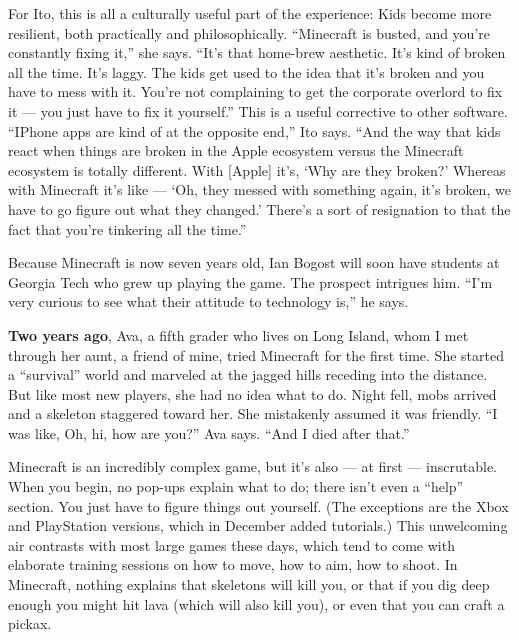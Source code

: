 For Ito, this is all a culturally useful part of the experience: Kids
become more resilient, both practically and philosophically. ``Minecraft
is busted, and you're constantly fixing it,'' she says. ``It's that
home-brew aesthetic. It's kind of broken all the time. It's laggy. The
kids get used to the idea that it's broken and you have to mess with it.
You're not complaining to get the corporate overlord to fix it --- you
just have to fix it yourself.'' This is a useful corrective to other
software. ``IPhone apps are kind of at the opposite end,'' Ito says.
``And the way that kids react when things are broken in the Apple
ecosystem versus the Minecraft ecosystem is totally different. With
{[}Apple{]} it's, `Why are they broken?' Whereas with Minecraft it's
like --- `Oh, they messed with something again, it's broken, we have to
go figure out what they changed.' There's a sort of resignation to that
the fact that you're tinkering all the time.''

Because Minecraft is now seven years old, Ian Bogost will soon have
students at Georgia Tech who grew up playing the game. The prospect
intrigues him. ``I'm very curious to see what their attitude to
technology is,'' he says.

\textbf{Two years ago}, Ava, a fifth grader who lives on Long Island,
whom I met through her aunt, a friend of mine, tried Minecraft for the
first time. She started a ``survival'' world and marveled at the jagged
hills receding into the distance. But like most new players, she had no
idea what to do. Night fell, mobs arrived and a skeleton staggered
toward her. She mistakenly assumed it was friendly. ``I was like, Oh,
hi, how are you?'' Ava says. ``And I died after that.''

Minecraft is an incredibly complex game, but it's also --- at first ---
inscrutable. When you begin, no pop-ups explain what to do; there isn't
even a ``help'' section. You just have to figure things out yourself.
(The exceptions are the Xbox and Play­Station versions, which in
December added tutorials.) This unwelcoming air contrasts with most
large games these days, which tend to come with elaborate training
sessions on how to move, how to aim, how to shoot. In Minecraft, nothing
explains that skeletons will kill you, or that if you dig deep enough
you might hit lava (which will also kill you), or even that you can
craft a pickax.

